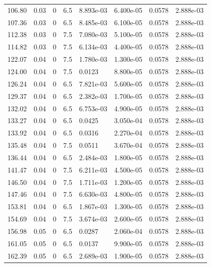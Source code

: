 \documentclass[preview]{standalone}
\begin{document}
{{{\begin{tabular}{L{1.2cm}C{1.2cm} C{0.3cm}C{0.5cm} C{1.4cm}C{1.4cm} C{1.4cm}C{1.4cm}}
  106.80  &  0.03  & 0     & 6.5 &  8.893e-03  & 6.400e-05  & 0.0578 &  2.888e-03   \\ 
  107.36  &  0.03  & 0     & 6.5 &  8.485e-03  & 6.100e-05  & 0.0578 &  2.888e-03   \\ 
  112.38  &  0.03  & 0     & 7.5 &  7.080e-03  & 5.100e-05  & 0.0578 &  2.888e-03   \\ 
  114.82  &  0.03  & 0     & 7.5 &  6.134e-03  & 4.400e-05  & 0.0578 &  2.888e-03   \\ 
  122.07  &  0.04  & 0     & 7.5 &  1.780e-03  & 1.300e-05  & 0.0578 &  2.888e-03   \\ 
  124.00  &  0.04  & 0     & 7.5 &  0.0123  & 8.800e-05  & 0.0578 &  2.888e-03   \\ 
  126.24  &  0.04  & 0     & 6.5 &  7.821e-03  & 5.600e-05  & 0.0578 &  2.888e-03   \\ 
  129.37  &  0.04  & 0     & 6.5 &  2.382e-03  & 1.700e-05  & 0.0578 &  2.888e-03   \\ 
  132.02  &  0.04  & 0     & 6.5 &  6.753e-03  & 4.900e-05  & 0.0578 &  2.888e-03   \\ 
  133.27  &  0.04  & 0     & 6.5 &  0.0425  & 3.050e-04  & 0.0578 &  2.888e-03   \\ 
  133.92  &  0.04  & 0     & 6.5 &  0.0316  & 2.270e-04  & 0.0578 &  2.888e-03   \\ 
  135.48  &  0.04  & 0     & 7.5 &  0.0511  & 3.670e-04  & 0.0578 &  2.888e-03   \\ 
  136.44  &  0.04  & 0     & 6.5 &  2.484e-03  & 1.800e-05  & 0.0578 &  2.888e-03   \\ 
  141.47  &  0.04  & 0     & 7.5 &  6.211e-03  & 4.500e-05  & 0.0578 &  2.888e-03   \\ 
  146.50  &  0.04  & 0     & 7.5 &  1.711e-03  & 1.200e-05  & 0.0578 &  2.888e-03   \\ 
  147.46  &  0.04  & 0     & 7.5 &  6.630e-03  & 4.800e-05  & 0.0578 &  2.888e-03   \\ 
  153.81  &  0.04  & 0     & 6.5 &  1.867e-03  & 1.300e-05  & 0.0578 &  2.888e-03   \\ 
  154.69  &  0.04  & 0     & 7.5 &  3.674e-03  & 2.600e-05  & 0.0578 &  2.888e-03   \\ 
  156.98  &  0.05  & 0     & 6.5 &  0.0287  & 2.060e-04  & 0.0578 &  2.888e-03   \\ 
  161.05  &  0.05  & 0     & 6.5 &  0.0137  & 9.900e-05  & 0.0578 &  2.888e-03   \\ 
  162.39  &  0.05  & 0     & 6.5 &  2.689e-03  & 1.900e-05  & 0.0578 &  2.888e-03   \\ 

\end{tabular}}}}
\end{document}
